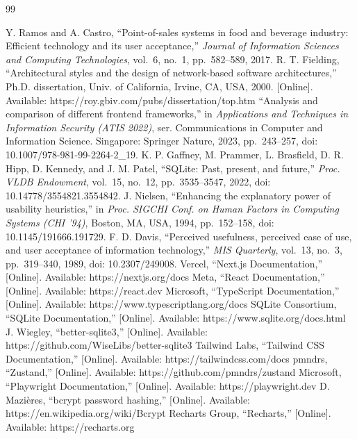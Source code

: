 \documentclass[12pt,a4paper]{report}
\begin{document}
\begin{thebibliography}{99}
 Y. Ramos and A. Castro, ``Point-of-sales systems in food and beverage industry: Efficient technology and its user acceptance,'' \textit{Journal of Information Sciences and Computing Technologies}, vol.~6, no.~1, pp.~582--589, 2017.
 R. T. Fielding, ``Architectural styles and the design of network-based software architectures,'' Ph.D. dissertation, Univ. of California, Irvine, CA, USA, 2000. [Online]. Available: https://roy.gbiv.com/pubs/dissertation/top.htm
 ``Analysis and comparison of different frontend frameworks,'' in \textit{Applications and Techniques in Information Security (ATIS 2022)}, ser. Communications in Computer and Information Science. Singapore: Springer Nature, 2023, pp.~243--257, doi: 10.1007/978-981-99-2264-2\_19.
 K. P. Gaffney, M. Prammer, L. Brasfield, D. R. Hipp, D. Kennedy, and J. M. Patel, ``SQLite: Past, present, and future,'' \textit{Proc. VLDB Endowment}, vol.~15, no.~12, pp.~3535--3547, 2022, doi: 10.14778/3554821.3554842.
 J. Nielsen, ``Enhancing the explanatory power of usability heuristics,'' in \textit{Proc. SIGCHI Conf. on Human Factors in Computing Systems (CHI '94)}, Boston, MA, USA, 1994, pp.~152--158, doi: 10.1145/191666.191729.
 F. D. Davis, ``Perceived usefulness, perceived ease of use, and user acceptance of information technology,'' \textit{MIS Quarterly}, vol.~13, no.~3, pp.~319--340, 1989, doi: 10.2307/249008.
 Vercel, ``Next.js Documentation,'' [Online]. Available: https://nextjs.org/docs
 Meta, ``React Documentation,'' [Online]. Available: https://react.dev
 Microsoft, ``TypeScript Documentation,'' [Online]. Available: https://www.typescriptlang.org/docs
 SQLite Consortium, ``SQLite Documentation,'' [Online]. Available: https://www.sqlite.org/docs.html
 J. Wiegley, ``better-sqlite3,'' [Online]. Available: https://github.com/WiseLibs/better-sqlite3
 Tailwind Labs, ``Tailwind CSS Documentation,'' [Online]. Available: https://tailwindcss.com/docs
 pmndrs, ``Zustand,'' [Online]. Available: https://github.com/pmndrs/zustand
 Microsoft, ``Playwright Documentation,'' [Online]. Available: https://playwright.dev
 D. Mazi\`eres, ``bcrypt password hashing,'' [Online]. Available: https://en.wikipedia.org/wiki/Bcrypt
 Recharts Group, ``Recharts,'' [Online]. Available: https://recharts.org
\end{thebibliography}
\end{document}
